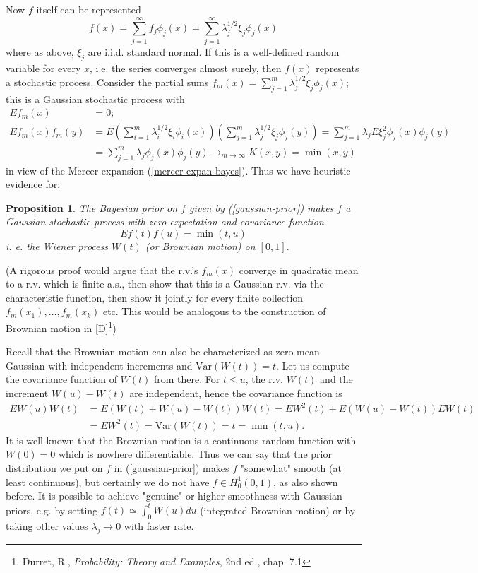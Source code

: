 \documentclass[11pt,twoside]{article}%
\theoremstyle{change}
\newtheorem{proposition}[theorem]{Proposition}
\begin{document}
Now $f$ itself can be represented
\[
f(x)=\sum_{j=1}^{\infty}f_{j}\phi_{j}(x)=\sum_{j=1}^{\infty}\lambda_{j}%
^{1/2}\xi_{j}\phi_{j}(x)
\]
where as above, $\xi_{j}$ are i.i.d. standard normal. If this is a
well-defined random variable for every $x$, i.e. the series converges almost
surely, then $f(x)$ represents a stochastic process. Consider the partial sums
$f_{m}(x)=\sum_{j=1}^{m}\lambda_{j}^{1/2}\xi_{j}\phi_{j}(x)$; this is a
Gaussian stochastic process with
\begin{align*}
Ef_{m}(x)  & =0\text{; }\\
Ef_{m}(x)f_{m}(y)  & =E\left(  \sum_{i=1}^{m}\lambda_{i}^{1/2}\xi_{i}\phi
_{i}(x)\right)  \left(  \sum_{j=1}^{m}\lambda_{j}^{1/2}\xi_{j}\phi
_{j}(y)\right)  =\sum_{j=1}^{m}\lambda_{j}E\xi_{j}^{2}\phi_{j}(x)\phi_{j}(y)\\
& =\sum_{j=1}^{m}\lambda_{j}\phi_{j}(x)\phi_{j}(y)\rightarrow_{m\rightarrow
\infty}K(x,y)=\min\left(  x,y\right)
\end{align*}
in view of the Mercer expansion (\ref{mercer-expan-bayes}). Thus we have
heuristic evidence for:

\begin{proposition}
The Bayesian prior on $f$ given by (\ref{gaussian-prior}) makes $f$ a Gaussian
stochastic process with zero expectation and covariance function
\[
Ef(t)f(u)=\min\left(  t,u\right)
\]
i. e. the Wiener process $W(t)$ (or Brownian motion) on $[0,1]$.
\end{proposition}

(A rigorous proof would argue that the r.v.'s $f_{m}(x)$ converge in quadratic
mean to a r.v. which is finite a.s., then show that this is a Gaussian r.v.
via the characteristic function, then show it jointly for every finite
collection $f_{m}(x_{1}),\ldots,f_{m}(x_{k})$ etc. This would be analogous to
the construction of Brownian motion in [D]\footnote{Durret, R.,
\textsl{Probability: Theory and Examples}, 2nd ed., chap. 7.1})

Recall that the Brownian motion can also be characterized as zero mean
Gaussian with independent increments and $\mathrm{Var}(W(t))=t$. Let us
compute the covariance function of $W(t)$ from there. For $t\leq u$, the r.v.
$W(t)$ and the increment $W(u)-W(t)$ are independent, hence the covariance
function is
\begin{align*}
EW(u)W(t)  & =E\left(  W(t)+W(u)-W(t)\right)  W(t)=EW^{2}(t)+E\left(
W(u)-W(t)\right)  EW(t)\\
& =EW^{2}(t)=\mathrm{Var}(W(t))=t=\min(t,u).
\end{align*}
It is well known that the Brownian motion is a continuous random function with
$W(0)=0$ which is nowhere differentiable. Thus we can say that the prior
distribution we put on $f$ in (\ref{gaussian-prior}) makes $f$ "somewhat"
smooth (at least continuous), but certainly we do not have $f\in H_{0}%
^{1}(0,1)$, as also shown before. It is possible to achieve "genuine" or
higher smoothness with Gaussian priors, e.g. by setting $f(t)\simeq\int
_{0}^{t}W(u)du$ (integrated Brownian motion) or by taking other values
$\lambda_{j}\rightarrow0$ with faster rate.%
\end{document}
